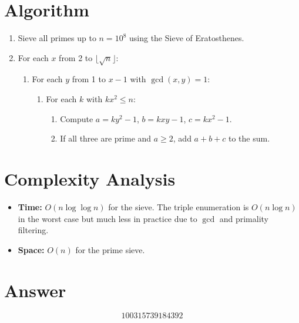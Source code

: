 \documentclass[11pt]{article}
\begin{document}
\section{Algorithm}

\begin{enumerate}
    \item Sieve all primes up to $n = 10^8$ using the Sieve of Eratosthenes.
    \item For each $x$ from 2 to $\lfloor\sqrt{n}\rfloor$:
    \begin{enumerate}
        \item For each $y$ from 1 to $x - 1$ with $\gcd(x, y) = 1$:
        \begin{enumerate}
            \item For each $k$ with $kx^2 \leq n$:
            \begin{enumerate}
                \item Compute $a = ky^2 - 1$, $b = kxy - 1$, $c = kx^2 - 1$.
                \item If all three are prime and $a \geq 2$, add $a + b + c$ to the sum.
            \end{enumerate}
        \end{enumerate}
    \end{enumerate}
\end{enumerate}

\section{Complexity Analysis}

\begin{itemize}
    \item \textbf{Time:} $O(n \log\log n)$ for the sieve. The triple enumeration is $O(n \log n)$ in the worst case but much less in practice due to $\gcd$ and primality filtering.
    \item \textbf{Space:} $O(n)$ for the prime sieve.
\end{itemize}

\section{Answer}

\[
\boxed{100315739184392}
\]
\end{document}
